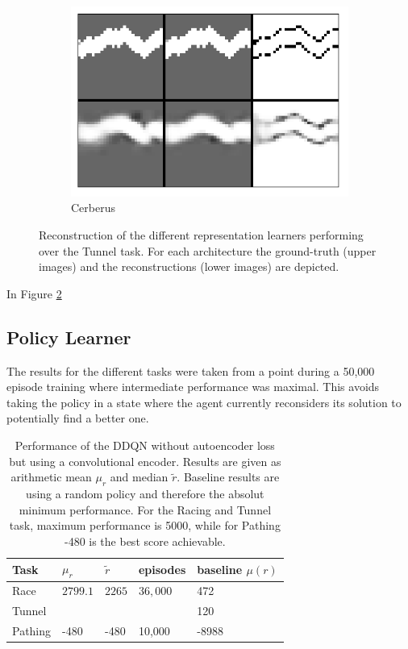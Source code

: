 \begin{figure}[t!]
	
	\begin{subfigure}{0.9\columnwidth}
		\centering
		\includegraphics[width=\linewidth]{img/cerberus_tunnel_recon.png}
		\caption{Cerberus}
		\label{subfig:cerberus_reconstruction}
	\end{subfigure}

	\caption{Reconstruction of the different representation learners performing over the Tunnel task. For each architecture the ground-truth (upper images) and the reconstructions (lower images) are depicted.}
	\label{fig:repr_learner_reconstructions}
\end{figure}

In Figure \ref{fig:repr_learner_reconstructions}
    
\subsection{Policy Learner}
The results for the different tasks were taken from a point during a 50,000 episode training where intermediate performance was maximal. This avoids taking the policy in a state where the agent currently reconsiders its solution to potentially find a better one.

\begin{table}[]
\centering
\begin{tabular}{@{}lllll@{}}
\toprule
\textbf{Task} & \textbf{$\mu_r$} & \textbf{$\widetilde{r}$} & \textbf{episodes} & \textbf{baseline} \textbf{$\mu(r)$} \\ \midrule
Race & $2799.1$ & $2265$ & $36,000$ & 472\\
Tunnel &  &  & & 120\\ 
Pathing & -480 & -480 & 10,000 & -8988\\ \bottomrule
\end{tabular}
\caption{Performance of the DDQN without autoencoder loss but using a convolutional encoder. Results are given as arithmetic mean $\mu_r$ and median $\widetilde{r}$. Baseline results are using a random policy and therefore the absolut minimum performance. For the Racing and Tunnel task, maximum performance is 5000, while for Pathing -480 is the best score achievable.}
\label{my-label}
\end{table}
    
